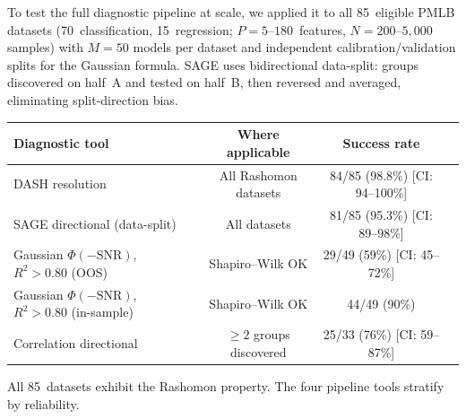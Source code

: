 \documentclass[11pt,a4paper]{article}
\begin{document}
To test the full diagnostic pipeline at scale, we applied it to all
85~eligible PMLB datasets (70~classification, 15~regression;
$P = 5$--$180$~features, $N = 200$--$5{,}000$ samples) with $M = 50$
models per dataset and independent calibration/validation splits for
the Gaussian formula.  SAGE uses bidirectional data-split: groups
discovered on half~A and tested on half~B, then reversed and averaged,
eliminating split-direction bias.

\begin{center}
\small
\begin{tabular}{lccc}
\toprule
Diagnostic tool & Where applicable & Success rate \\
\midrule
DASH resolution & All Rashomon datasets & 84/85 (98.8\%) [CI: 94--100\%] \\
SAGE directional (data-split) & All datasets & 81/85 (95.3\%) [CI: 89--98\%] \\
Gaussian $\Phi(-\text{SNR})$, $R^2 > 0.80$ (OOS) & Shapiro--Wilk OK & 29/49 (59\%) [CI: 45--72\%] \\
Gaussian $\Phi(-\text{SNR})$, $R^2 > 0.80$ (in-sample) & Shapiro--Wilk OK & 44/49 (90\%) \\
Correlation directional & $\geq 2$ groups discovered & 25/33 (76\%) [CI: 59--87\%] \\
\bottomrule
\end{tabular}
\end{center}

All 85~datasets exhibit the Rashomon property.  The four pipeline tools
stratify by reliability.
\end{document}

